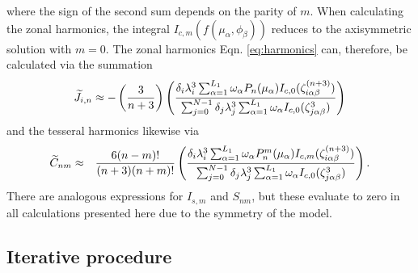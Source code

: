 %
where the sign of the second sum depends on the parity of $m$.  When calculating the
zonal harmonics, the integral $I_{c,m}(f(\mu_\alpha,\phi_\beta))$ reduces to the
axisymmetric solution with $m=0$. The zonal harmonics Eqn.  \eqref{eq:harmonics} can,
therefore, be calculated via the summation
%
\begin{equation} \begin{aligned} \widetilde{J}_{i,n} \approx - \left( \frac{3}{n+3} \right)
        \left( \frac{ \delta_i \lambda_i^3 \sum^{L_1}_{\alpha =1} \omega_{\alpha}
        P_n(\mu_{\alpha}) I_{c,0}( \zeta_{i\alpha\beta}^{(n+3)})} { \sum_{j=0}^{N-1}
        \delta_j \lambda_j^3  \sum^{L_1}_{\alpha =1} \omega_{\alpha} I_{c,0}(
        \zeta_{j\alpha\beta}^{3} )} \right) \end{aligned} \label{eq:zonal_quad}
\end{equation}
%
and the tesseral harmonics likewise via
%
\begin{equation} \begin{aligned} \widetilde{C}_{nm} &\approx&  \frac{6(n-m)!}{(n+3)(n+m)!}
        \left( \frac{ \delta_i \lambda_i^3 \sum^{L_1}_{\alpha =1} \omega_{\alpha}
        P^m_n(\mu_{\alpha})  I_{c,m}(\zeta_{i\alpha\beta}^{(n+3)}) } {
            \sum_{j=0}^{N-1} \delta_j \lambda_j^3 \sum^{L_1}_{\alpha =1}
            \omega_{\alpha} I_{c,0}(\zeta_{j\alpha\beta}^3)} \right).  \end{aligned}
        \label{eq:tesseral_quad} \end{equation}
%
There are analogous expressions for $I_{s,m}$ and $S_{nm}$, but these evaluate to
zero in all calculations presented here due to the symmetry of the model.

\subsection{Iterative procedure} \label{iterative}

